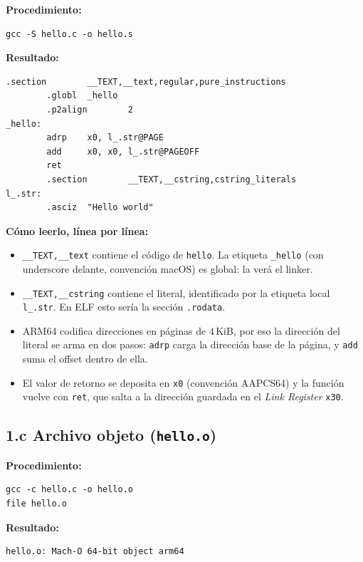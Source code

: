 \documentclass[11pt,a4paper]{article}
\begin{document}
\textbf{Procedimiento:}

\begin{lstlisting}
gcc -S hello.c -o hello.s
\end{lstlisting}

\textbf{Resultado:}

\begin{lstlisting}[style=asmstyle]
        .section        __TEXT,__text,regular,pure_instructions
        .globl  _hello
        .p2align        2
_hello:
        adrp    x0, l_.str@PAGE
        add     x0, x0, l_.str@PAGEOFF
        ret
        .section        __TEXT,__cstring,cstring_literals
l_.str:
        .asciz  "Hello world"
\end{lstlisting}

\textbf{Cómo leerlo, línea por línea:}
\begin{itemize}[leftmargin=*]
    \item \texttt{\_\_TEXT,\_\_text} contiene el código de
        \texttt{hello}. La etiqueta \texttt{\_hello} (con underscore
        delante, convención macOS) es global: la verá el linker.
    \item \texttt{\_\_TEXT,\_\_cstring} contiene el literal,
        identificado por la etiqueta local \texttt{l\_.str}. En ELF
        esto sería la sección \texttt{.rodata}.
    \item ARM64 codifica direcciones en páginas de 4\,KiB, por eso la
        dirección del literal se arma en dos pasos: \texttt{adrp}
        carga la dirección base de la página, y \texttt{add} suma el
        offset dentro de ella.
    \item El valor de retorno se deposita en \texttt{x0} (convención
        AAPCS64) y la función vuelve con \texttt{ret}, que salta a la
        dirección guardada en el \emph{Link Register} \texttt{x30}.
\end{itemize}

\subsection*{1.c Archivo objeto (\texttt{hello.o})}

\textbf{Procedimiento:}

\begin{lstlisting}
gcc -c hello.c -o hello.o
file hello.o
\end{lstlisting}

\textbf{Resultado:}

\begin{lstlisting}[style=outstyle]
hello.o: Mach-O 64-bit object arm64
\end{lstlisting}
\end{document}
